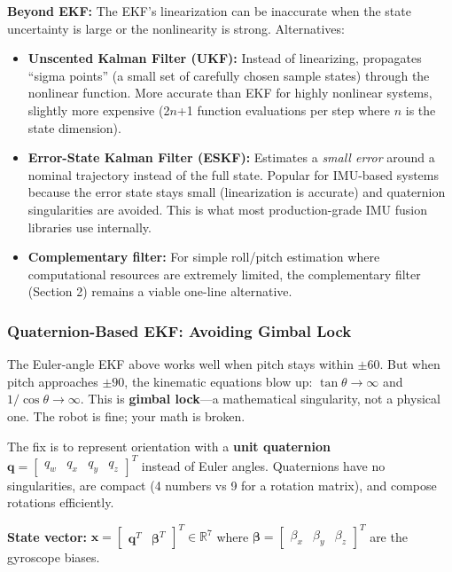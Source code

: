 \textbf{Beyond EKF:} The EKF's linearization can be inaccurate when the state uncertainty is large or the nonlinearity is strong. Alternatives:
\begin{itemize}
    \item \textbf{Unscented Kalman Filter (UKF):} Instead of linearizing, propagates ``sigma points'' (a small set of carefully chosen sample states) through the nonlinear function. More accurate than EKF for highly nonlinear systems, slightly more expensive (2$n$+1 function evaluations per step where $n$ is the state dimension).
    \item \textbf{Error-State Kalman Filter (ESKF):} Estimates a \textit{small error} around a nominal trajectory instead of the full state. Popular for IMU-based systems because the error state stays small (linearization is accurate) and quaternion singularities are avoided. This is what most production-grade IMU fusion libraries use internally.
    \item \textbf{Complementary filter:} For simple roll/pitch estimation where computational resources are extremely limited, the complementary filter (Section 2) remains a viable one-line alternative.
\end{itemize}

\subsubsection{Quaternion-Based EKF: Avoiding Gimbal Lock}

The Euler-angle EKF above works well when pitch stays within $\pm 60$\textdegree{}. But when pitch approaches $\pm 90$\textdegree{}, the kinematic equations blow up: $\tan\theta \to \infty$ and $1/\cos\theta \to \infty$. This is \textbf{gimbal lock}---a mathematical singularity, not a physical one. The robot is fine; your math is broken.

The fix is to represent orientation with a \textbf{unit quaternion} $\mathbf{q} = \begin{bmatrix} q_w & q_x & q_y & q_z \end{bmatrix}^T$ instead of Euler angles. Quaternions have no singularities, are compact (4 numbers vs 9 for a rotation matrix), and compose rotations efficiently.

\textbf{State vector:} $\mathbf{x} = \begin{bmatrix} \mathbf{q}^T & \boldsymbol{\beta}^T \end{bmatrix}^T \in \mathbb{R}^7$ where $\boldsymbol{\beta} = \begin{bmatrix} \beta_x & \beta_y & \beta_z \end{bmatrix}^T$ are the gyroscope biases.


